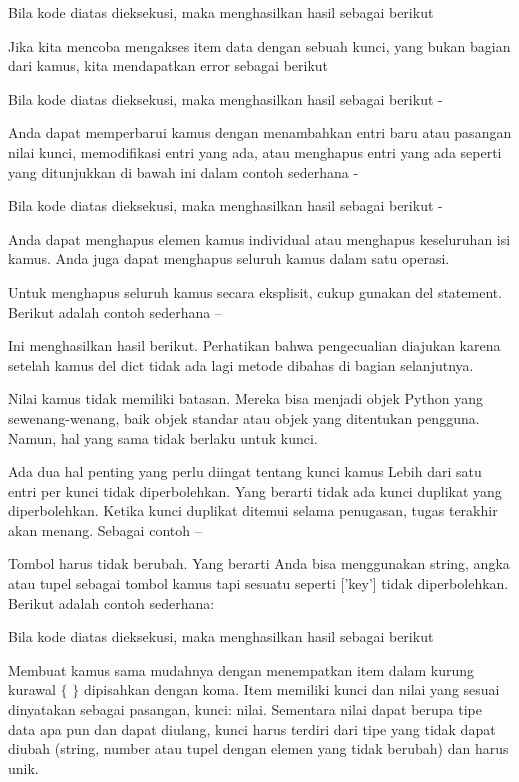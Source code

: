 Bila kode diatas dieksekusi, maka menghasilkan hasil sebagai berikut 

Jika kita mencoba mengakses item data dengan sebuah kunci, yang bukan bagian dari kamus, kita mendapatkan error sebagai berikut 

Bila kode diatas dieksekusi, maka menghasilkan hasil sebagai berikut - 

Anda dapat memperbarui kamus dengan menambahkan entri baru atau pasangan nilai kunci, memodifikasi entri yang ada, atau menghapus entri yang ada seperti yang ditunjukkan di bawah ini dalam contoh sederhana - \par

Bila kode diatas dieksekusi, maka menghasilkan hasil sebagai berikut - \par

Anda dapat menghapus elemen kamus individual atau menghapus keseluruhan isi kamus. Anda juga dapat menghapus seluruh kamus dalam satu operasi.

Untuk menghapus seluruh kamus secara eksplisit, cukup gunakan del statement. Berikut adalah contoh sederhana – \par

Ini menghasilkan hasil berikut. Perhatikan bahwa pengecualian diajukan karena setelah kamus del dict tidak ada lagi metode dibahas di bagian selanjutnya. \par

Nilai kamus tidak memiliki batasan. Mereka bisa menjadi objek Python yang sewenang-wenang, baik objek standar atau objek yang ditentukan pengguna. Namun, hal yang sama tidak berlaku untuk kunci. \par
 
Ada dua hal penting yang perlu diingat tentang kunci kamus 
Lebih dari satu entri per kunci tidak diperbolehkan. Yang berarti tidak ada kunci duplikat yang diperbolehkan. Ketika kunci duplikat ditemui selama penugasan, tugas terakhir akan menang. Sebagai contoh – \par
Tombol harus tidak berubah. Yang berarti Anda bisa menggunakan string, angka atau tupel sebagai tombol kamus tapi sesuatu seperti ['key'] tidak diperbolehkan. Berikut adalah contoh sederhana: \par

Bila kode diatas dieksekusi, maka menghasilkan hasil sebagai berikut 

Membuat kamus sama mudahnya dengan menempatkan item dalam kurung kurawal  $  \{  $ $  \}  $ dipisahkan dengan koma. Item memiliki kunci dan nilai yang sesuai dinyatakan sebagai pasangan, kunci: nilai. Sementara nilai dapat berupa tipe data apa pun dan dapat diulang, kunci harus terdiri dari tipe yang tidak dapat diubah (string, number atau tupel dengan elemen yang tidak berubah) dan harus unik. \par

